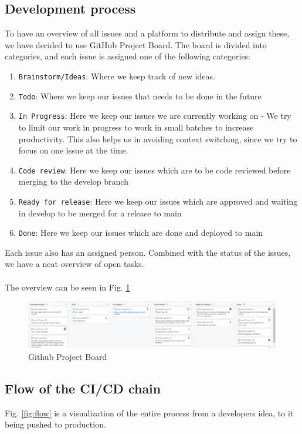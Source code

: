 \documentclass[10pt]{article}
\begin{document}
\subsection{Development process}
\label{Development_process}
To have an overview of all issues and a platform to distribute and assign these, we have decided to use GitHub Project Board.
The board is divided into categories, and each issue is assigned one of the following categories:
\begin{enumerate}
    \item \texttt{Brainstorm/Ideas}: Where we keep track of new ideas.
    \item \texttt{Todo}: Where we keep our issues that needs to be done in the future
    \item \texttt{In Progress}: Here we keep our issues we are currently working on - We try to limit our work in progress to work in small batches to increase productivity. This also helps us in avoiding context switching, since we try to focus on one issue at the time.
    \item \texttt{Code review}: Here we keep our issues which are to be code reviewed before merging to the develop branch
    \item \texttt{Ready for release}: Here we keep our issues which are approved and waiting in develop to be merged for a release to main
    \item \texttt{Done}: Here we keep our issues which are done and deployed to main
\end{enumerate}
Each issue also has an assigned person. Combined with the status of the issues, we have a neat overview of open tasks.
\\
\\
The overview can be seen in Fig. \ref{fig:Kanban}


\begin{figure}[h]
    \centering
    \includegraphics[width=\textwidth]{images/Kanban.PNG}
    \caption{Github Project Board}
    \label{fig:Kanban}
\end{figure}
\subsection{Flow of the CI/CD chain}
\label{cicdchain}
Fig. \ref{fig:flow} is a visualization of the entire process from a developers idea, to it being pushed to production.
\end{document}
